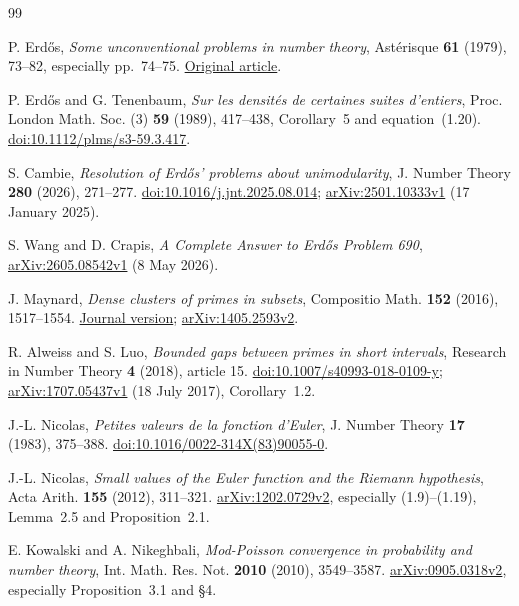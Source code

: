 \documentclass[11pt]{article}
\theoremstyle{definition}
\begin{document}
\begin{thebibliography}{99}
\small\raggedright
\setlength{\itemsep}{3pt}
\setlength{\parsep}{0pt}
P. Erd\H{o}s, \emph{Some unconventional problems in number theory},
Ast\'erisque \textbf{61} (1979), 73--82, especially pp.~74--75.
\href{https://www.numdam.org/item/AST_1979__61__73_0.pdf}{Original article}.

P. Erd\H{o}s and G. Tenenbaum,
\emph{Sur les densit\'es de certaines suites d'entiers},
Proc. London Math. Soc. (3) \textbf{59} (1989), 417--438,
Corollary~5 and equation~(1.20).
\href{https://doi.org/10.1112/plms/s3-59.3.417}{doi:10.1112/plms/s3-59.3.417}.

S. Cambie, \emph{Resolution of Erd\H{o}s' problems about unimodularity},
J. Number Theory \textbf{280} (2026), 271--277.
\href{https://doi.org/10.1016/j.jnt.2025.08.014}{doi:10.1016/j.jnt.2025.08.014};
\href{https://arxiv.org/abs/2501.10333v1}{arXiv:2501.10333v1}
(17 January 2025).

S. Wang and D. Crapis,
\emph{A Complete Answer to Erd\H{o}s Problem 690},
\href{https://arxiv.org/abs/2605.08542v1}{arXiv:2605.08542v1}
(8 May 2026).

J. Maynard, \emph{Dense clusters of primes in subsets},
Compositio Math. \textbf{152} (2016), 1517--1554.
\href{https://doi.org/10.1112/S0010437X16007296}{Journal version};
\href{https://arxiv.org/abs/1405.2593v2}{arXiv:1405.2593v2}.

R. Alweiss and S. Luo, \emph{Bounded gaps between primes in short intervals},
Research in Number Theory \textbf{4} (2018), article 15.
\href{https://doi.org/10.1007/s40993-018-0109-y}{doi:10.1007/s40993-018-0109-y};
\href{https://arxiv.org/abs/1707.05437v1}{arXiv:1707.05437v1}
(18 July 2017), Corollary~1.2.

J.-L. Nicolas, \emph{Petites valeurs de la fonction d'Euler},
J. Number Theory \textbf{17} (1983), 375--388.
\href{https://doi.org/10.1016/0022-314X(83)90055-0}{doi:10.1016/0022-314X(83)90055-0}.

J.-L. Nicolas, \emph{Small values of the Euler function and the
Riemann hypothesis}, Acta Arith. \textbf{155} (2012), 311--321.
\href{https://arxiv.org/abs/1202.0729v2}{arXiv:1202.0729v2},
especially (1.9)--(1.19), Lemma~2.5 and Proposition~2.1.

E. Kowalski and A. Nikeghbali,
\emph{Mod-Poisson convergence in probability and number theory},
Int. Math. Res. Not. \textbf{2010} (2010), 3549--3587.
\href{https://arxiv.org/abs/0905.0318v2}{arXiv:0905.0318v2},
especially Proposition~3.1 and \S4.


\end{thebibliography}
\end{document}
